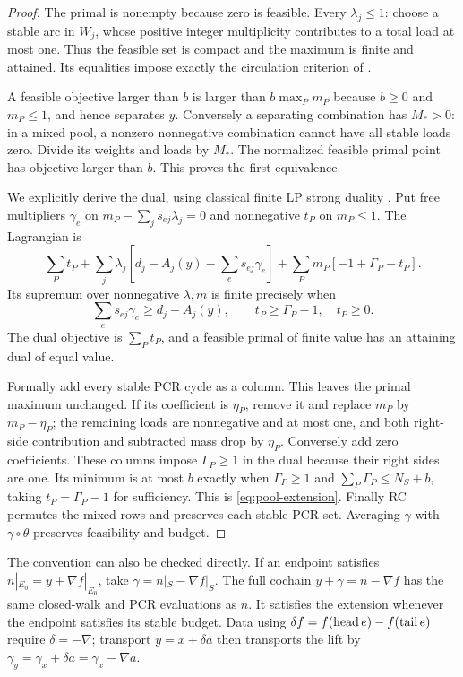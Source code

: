 \begin{proof}
The primal is nonempty because zero is feasible. Every $\lambda_j\le1$:
choose a stable arc in $W_j$, whose positive integer multiplicity contributes
to a total load at most one. Thus the feasible set is compact and the maximum
is finite and attained. Its equalities impose exactly the circulation
criterion of .

A feasible objective larger than $b$ is larger than $b\max_Pm_P$ because
$b\ge0$ and $m_P\le1$, and hence separates $y$. Conversely a separating
combination has $M_*>0$: in a mixed pool, a nonzero nonnegative combination
cannot have all stable loads zero. Divide its weights and loads by $M_*$.
The normalized feasible primal point has objective larger than $b$.
This proves the first equivalence.

We explicitly derive the dual, using classical finite LP strong duality
\cite[Chapter 5]{BoydVandenberghe2004}. Put free multipliers $\gamma_e$ on
$m_P-\sum_js_{ej}\lambda_j=0$ and nonnegative $t_P$ on $m_P\le1$.
The Lagrangian is
\[
 \sum_Pt_P+\sum_j\lambda_j\left[d_j-A_j(y)-\sum_es_{ej}\gamma_e\right]
 +\sum_Pm_P[-1+\Gamma_P-t_P].
\]
Its supremum over nonnegative $\lambda,m$ is finite precisely when
\[
 \sum_es_{ej}\gamma_e\ge d_j-A_j(y),\qquad
 t_P\ge\Gamma_P-1,\quad t_P\ge0.
\]
The dual objective is $\sum_Pt_P$, and a feasible primal of finite value has
an attaining dual of equal value.

Formally add every stable PCR cycle as a column. This leaves the primal
maximum unchanged. If its coefficient is $\eta_P$, remove it and replace
$m_P$ by $m_P-\eta_P$; the remaining loads are nonnegative and at most one,
and both right-side contribution and subtracted mass drop by $\eta_P$.
Conversely add zero coefficients. These columns impose $\Gamma_P\ge1$ in
the dual because their right sides are one. Its minimum is at most $b$
exactly when $\Gamma_P\ge1$ and $\sum_P\Gamma_P\le N_S+b$, taking
$t_P=\Gamma_P-1$ for sufficiency. This is \eqref{eq:pool-extension}.
Finally RC permutes the mixed rows and preserves each stable PCR set.
Averaging $\gamma$ with $\gamma\circ\theta$ preserves feasibility and budget.
\end{proof}

The convention can also be checked directly. If an endpoint satisfies
$n|_{E_0}=y+\nabla f|_{E_0}$, take
$\gamma=n|_S-\nabla f|_S$. The full cochain $y+\gamma=n-\nabla f$
has the same closed-walk and PCR evaluations as $n$. It satisfies the
extension whenever the endpoint satisfies its stable budget. Data using
$\delta f= f(\operatorname{head} e)-f(\operatorname{tail} e)$ require $\delta=-\nabla$;
transport $y=x+\delta a$ then transports the lift by
$\gamma_y=\gamma_x+\delta a=\gamma_x-\nabla a$.

